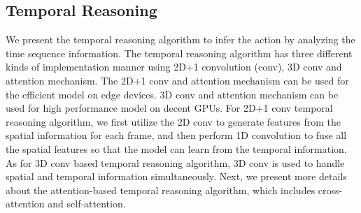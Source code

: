 \documentclass[letterpaper, 10 pt, conference]{ieeeconf}
\begin{document}
\subsection{Temporal Reasoning}
We present the temporal reasoning algorithm to infer the action by analyzing the time sequence information. The temporal reasoning algorithm has three different kinds of implementation manner using 2D+1 convolution (conv), 3D conv and attention mechanism. The 2D+1 conv and attention mechanism can be used for the efficient model on edge devices. 3D conv and attention mechanism can be used for high performance model on decent GPUs. For 2D+1 conv temporal reasoning algorithm, we first utilize the 2D conv to generate features from the spatial information for each frame, and then perform 1D convolution to fuse all the spatial features so that the model can learn from the temporal information. As for 3D conv based temporal reasoning algorithm, 3D conv is used to handle spatial and temporal information simultaneously. Next, we present more details about the attention-based temporal reasoning algorithm, which includes cross-attention and self-attention.
\end{document}
